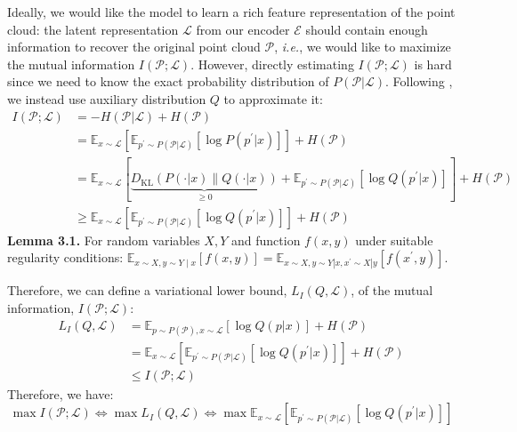 \documentclass[runningheads]{llncs}
\begin{document}
Ideally, we would like the model to learn a rich feature representation of the point cloud: the latent representation $\mathcal{L}$ from our encoder $\mathcal{E}$ should contain enough information to recover the original point cloud $\mathcal{P}$, \textit{i.e.}, we would like to maximize the mutual information $I(\mathcal{P}; \mathcal{L})$. However, directly estimating $I(\mathcal{P}; \mathcal{L})$ is hard since we need to know the exact probability distribution of $P(\mathcal{P} | \mathcal{L})$.  Following \cite{chen2016infogan}, we instead use auxiliary distribution $Q$ to approximate it:
\begin{equation}
\begin{aligned}
I(\mathcal{P}; \mathcal{L}) &=-H(\mathcal{P} | \mathcal{L}) + H(\mathcal{P}) \\
&=\mathbb{E}_{x \sim \mathcal{L}}[\mathbb{E}_{p^{\prime} \sim P(\mathcal{P} | \mathcal{L})}[\log P(p^{\prime} | x)]]+H(\mathcal{P}) \\
&=\mathbb{E}_{x \sim \mathcal{L}}[\underbrace{D_{\mathrm{KL}}(P(\cdot | x) \| Q(\cdot | x))}_{\geq 0} + \mathbb{E}_{p^{\prime} \sim P(\mathcal{P}|\mathcal{L})}[\log Q(p^{\prime} | x)]]+H(\mathcal{P}) \\
& \geq \mathbb{E}_{x \sim \mathcal{L}}[\mathbb{E}_{p^{\prime} \sim P(\mathcal{P}|\mathcal{L})}[\log Q(p^{\prime} | x)]]+H(\mathcal{P})
\end{aligned}
\end{equation}
\textbf{Lemma 3.1.} For random variables $X, Y$ and function $f(x, y)$ under suitable regularity conditions: $\mathbb{E}_{x \sim X, y \sim Y \mid x}[f(x, y)]=\mathbb{E}_{x \sim X, y \sim Y|x, x^{\prime} \sim X| y}[f(x^{\prime}, y)]$.

Therefore, we can define a variational lower bound, $L_{I}(Q, \mathcal{L})$, of the mutual information, $I(\mathcal{P}; \mathcal{L})$:
\begin{equation}
    \begin{aligned}
L_{I}(Q, \mathcal{L}) &=\mathbb{E}_{p \sim P(\mathcal{P}), x \sim \mathcal{L}}[\log Q(p|x)]
+ H(\mathcal{P}) \\
&=\mathbb{E}_{x \sim \mathcal{L}}[\mathbb{E}_{p^{\prime} \sim P(\mathcal{P}|\mathcal{L})}[\log Q(p^{\prime} | x)]] + H(\mathcal{P}) \\
& \leq I(\mathcal{P}; \mathcal{L})
\end{aligned}
\end{equation}
Therefore, we have:
\begin{equation}
\max I(\mathcal{P}; \mathcal{L}) \iff \max L_{I}(Q, \mathcal{L}) \iff \max \mathbb{E}_{x \sim \mathcal{L}}[\mathbb{E}_{p^{\prime} \sim P(\mathcal{P}|\mathcal{L})}[\log Q(p^{\prime} | x)]]
\end{equation}
\end{document}
